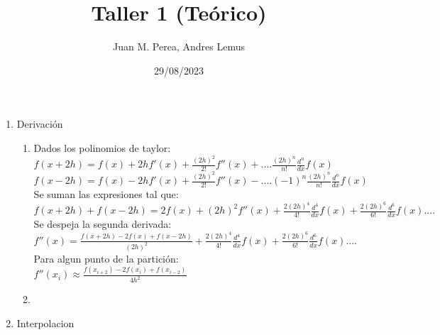 \documentclass{article}
\title{Taller 1 (Teórico)}
\author{Juan M. Perea, Andres Lemus}
\date{29/08/2023}
\begin{document}
\maketitle

\begin{enumerate}
\renewcommand{\theenumi}{\roman{enumi}}
\item Derivación
	\begin{enumerate}
	\renewcommand{\theenumii}{\arabic{enumii}}
	\item
		Dados los polinomios de taylor:\\
		$f(x+2h)=f(x)+2hf'(x)+\frac{(2h)^2}{2!}f''(x)+....\frac{(2h)^n}{n!}\frac{d^n}{dx}f(x)$\\
		$f(x-2h)=f(x)-2hf'(x)+\frac{(2h)^2}{2!}f''(x)-....(-1)^n\frac{(2h)^n}{n!}\frac{d^n}{dx}f(x)$\\
		Se suman las expresiones tal que:\\
		$f(x+2h)+f(x-2h)=2f(x)+(2h)^2f''(x)+\frac{2(2h)^4}{4!}\frac{d^4}{dx}f(x)+\frac{2(2h)^6}{6!}\frac{d^6}{dx}f(x)....$\\
		Se despeja la segunda derivada:\\
		$f''(x)=\frac{f(x+2h)-2f(x)+f(x-2h)}{(2h)^2}+\frac{2(2h)^4}{4!}\frac{d^4}{dx}f(x)+\frac{2(2h)^6}{6!}\frac{d^6}{dx}f(x)....$\\
		Para algun punto de la partición:\\
		$f''(x_i)\approx\frac{f(x_{i+2})-2f(x_i)+f(x_{i-2})}{4h^2}$
	\item
	\end{enumerate}
\item Interpolacion
\end{enumerate}
\end{document}
